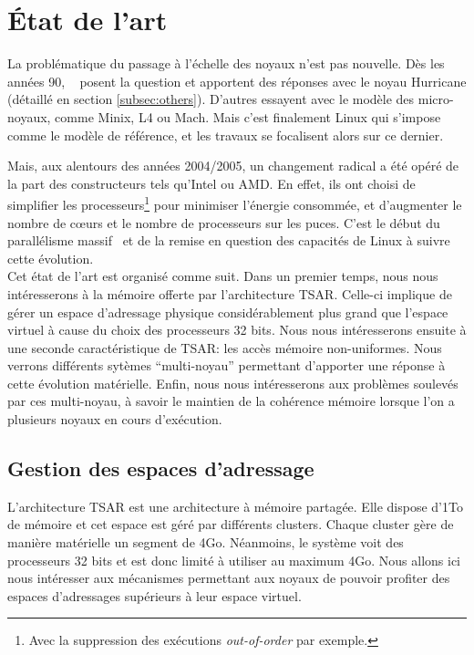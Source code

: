 \chapter{État de l’art}

  La problématique du passage à l’échelle des noyaux n’est pas nouvelle. Dès les
  années 90, ~\citeauthor{unrau1995hierarchical} posent la question et apportent
  des réponses avec le noyau Hurricane (détaillé en section
  \ref{subsec:others}). D’autres essayent avec le modèle des micro-noyaux, comme
  Minix, L4 ou Mach. Mais c'est finalement Linux qui s’impose comme le modèle de
  référence, et les travaux se focalisent alors sur ce dernier.

  Mais, aux alentours des années 2004/2005, un changement radical a été opéré de
  la part des constructeurs tels qu’Intel ou AMD. En effet, ils ont choisi de
  simplifier les processeurs\footnote{Avec la suppression des exécutions
    \textit{out-of-order} par exemple.} pour minimiser l'énergie consommée, et
  d'augmenter le nombre de c\oe urs et le nombre de processeurs sur les
  puces. C'est le début du parallélisme massif~\citep{patterson2011parallel} et
  de la remise en question des capacités de Linux à suivre cette évolution.\\

  Cet état de l'art est organisé comme suit. Dans un premier temps, nous nous
  intéresserons à la mémoire offerte par l'architecture TSAR. Celle-ci implique
  de gérer un espace d'adressage physique considérablement plus grand que
  l'espace virtuel à cause du choix des processeurs 32 bits. Nous nous
  intéresserons ensuite à une seconde caractéristique de TSAR: les accès mémoire
  non-uniformes. Nous verrons différents sytèmes ``multi-noyau'' permettant
  d'apporter une réponse à cette évolution matérielle. Enfin, nous nous
  intéresserons aux problèmes soulevés par ces multi-noyau, à savoir le maintien
  de la cohérence mémoire lorsque l'on a plusieurs noyaux en cours d'exécution.


  \section{Gestion des espaces d'adressage}
  \label{sec:memory}    

    L'architecture TSAR est une architecture à mémoire partagée. Elle dispose
    d'1To de mémoire et cet espace est géré par différents clusters. Chaque
    cluster gère de manière matérielle un segment de 4Go. Néanmoins, le système
    voit des processeurs 32 bits et est donc limité à utiliser au maximum
    4Go. Nous allons ici nous intéresser aux mécanismes permettant aux noyaux de
    pouvoir profiter des espaces d'adressages supérieurs à leur espace virtuel.


